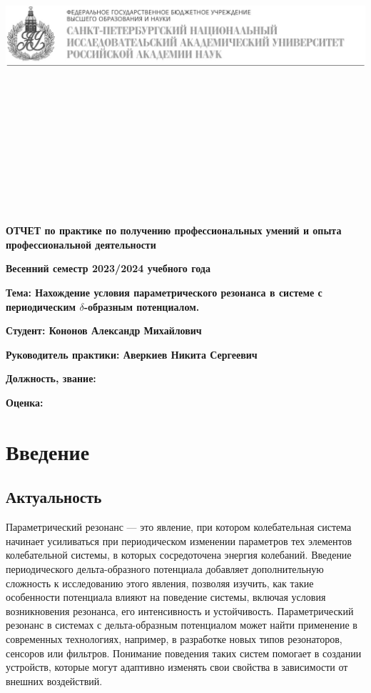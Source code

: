 \documentclass[11pt]{article}    %
\begin{document}
\begin{titlepage}

\includegraphics[scale = 0.43]{alf4.JPG}

\

\

\

\

\

\

\begin{center}
    {\bf ОТЧЕТ по практике по получению профессиональных умений и опыта профессиональной деятельности}

    {\bf Весенний семестр 2023/2024 учебного года}

    {\bf Тема: Нахождение условия параметрического резонанса в системе с периодическим $\delta$-образным потенциалом.}

\end{center}

    {\bf Студент: Кононов Александр Михайлович}

    {\bf Руководитель практики: Аверкиев Никита Сергеевич}

    {\bf Должность, звание:}

    {\bf Оценка:}

\end{titlepage}

\tableofcontents
\newpage

\section{Введение}
\subsection{Актуальность}
Параметрический резонанс — это явление, при котором колебательная система начинает усиливаться при периодическом изменении параметров тех элементов колебательной системы, в которых сосредоточена энергия колебаний. Введение периодического дельта-образного потенциала добавляет дополнительную сложность к исследованию этого явления, позволяя изучить, как такие особенности потенциала влияют на поведение системы, включая условия возникновения резонанса, его интенсивность и устойчивость.
Параметрический резонанс в системах с дельта-образным потенциалом может найти применение в современных технологиях, например, в разработке новых типов резонаторов, сенсоров или фильтров. Понимание поведения таких систем помогает в создании устройств, которые могут адаптивно изменять свои свойства в зависимости от внешних воздействий.
\end{document}

